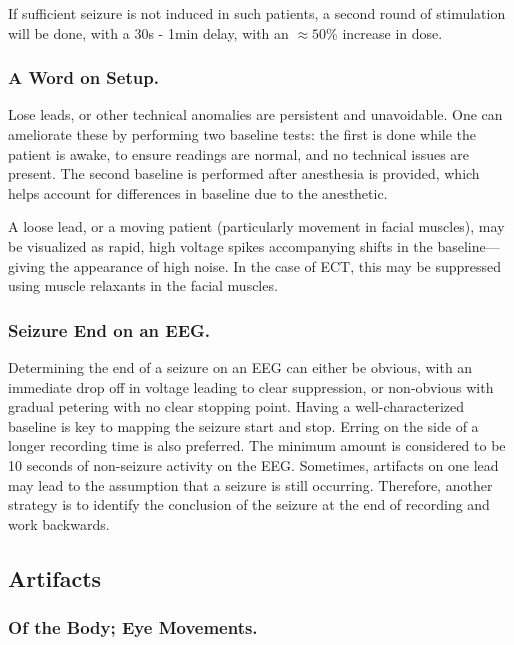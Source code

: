 If sufficient seizure is not induced in such patients, a second round of stimulation will be done, with a 30s - 1min delay, with an $\approx 50 \%$ increase in dose. 

\subsubsection{A Word on Setup.}

Lose leads, or other technical anomalies are persistent and unavoidable. One can ameliorate these by performing two baseline tests: the first is done while the patient is awake, to ensure readings are normal, and no technical issues are present. The second baseline is performed after anesthesia is provided, which helps account for differences in baseline due to the anesthetic.\newline

A loose lead, or a moving patient (particularly movement in facial muscles), may be visualized as rapid, high voltage spikes accompanying shifts in the baseline---giving the appearance of high noise. In the case of ECT, this may be suppressed using muscle relaxants in the facial muscles. 

\subsubsection{Seizure End on an EEG.}

Determining the end of a seizure on an EEG can either be obvious, with an immediate drop off in voltage leading to clear suppression, or non-obvious with gradual petering with no clear stopping point. Having a well-characterized baseline is key to mapping the seizure start and stop. Erring on the side of a longer recording time is also preferred. The minimum amount is considered to be 10 seconds of non-seizure activity on the EEG. Sometimes, artifacts on one lead may lead to the assumption that a seizure is still occurring. Therefore, another strategy is to identify the conclusion of the seizure at the end of recording and work backwards. 

\subsection{Artifacts}

\subsubsection{Of the Body; Eye Movements.}

